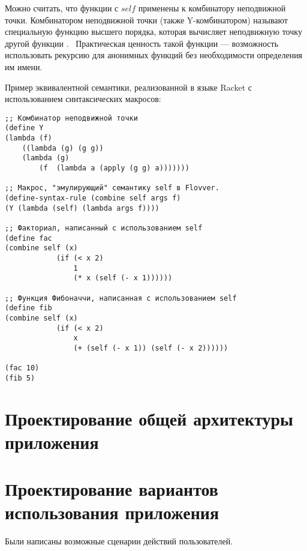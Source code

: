 Можно считать, что функции с $self$ применены к комбинатору неподвижной точки. Комбинатором неподвижной точки (также Y-комбинатором) называют специальную функцию высшего порядка, которая вычисляет неподвижную точку другой функции \cite{tapl}. 
Практическая ценность такой функции --- возможность использовать рекурсию для анонимных функций без необходимости определения им имени.

Пример эквивалентной семантики, реализованной в языке Racket с использованием синтаксических макросов:

\begin{lstlisting}
;; Комбинатор неподвижной точки
(define Y
(lambda (f)
	((lambda (g) (g g))
	(lambda (g)       
		(f  (lambda a (apply (g g) a)))))))

;; Макрос, "эмулирующий" семантику self в Flovver.
(define-syntax-rule (combine self args f)
(Y (lambda (self) (lambda args f))))

;; Факториал, написанный с использованием self
(define fac
(combine self (x)
			(if (< x 2)
				1
				(* x (self (- x 1))))))

;; Функция Фибоначчи, написанная с использованием self
(define fib
(combine self (x)
			(if (< x 2)
				x
				(+ (self (- x 1)) (self (- x 2))))))

(fac 10)
(fib 5)  
\end{lstlisting}

\FloatBarrier

\section{Проектирование общей архитектуры приложения}\label{sec:ch2/sec2}

\section{Проектирование вариантов использования приложения}\label{sec:ch2/sec3}

Были написаны возможные сценарии действий пользователей.

